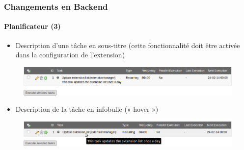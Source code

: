 
\begin{frame}[fragile]
	\frametitle{Changements en Backend}
	\framesubtitle{Planificateur (3)}

	\begin{itemize}
		\item Description d'une tâche en sous-titre\newline
			\small(cette fonctionnalité doit être activée dans la configuration de l'extension)\normalsize
	\end{itemize}

	\begin{figure}
		\includegraphics[width=0.95\linewidth]{Images/BackendChanges/SchedulerTaskDescriptionAsSubheader.png}
	\end{figure}

	\begin{itemize}
		\item Description de la tâche en infobulle (« hover »)
	\end{itemize}

	\begin{figure}
		\includegraphics[width=0.95\linewidth]{Images/BackendChanges/SchedulerTaskDescriptionAsTooltip.png}
	\end{figure}

\end{frame}


